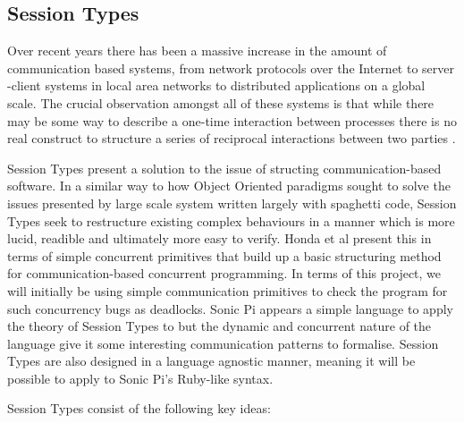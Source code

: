 \documentclass[11pt, abstracton, twoside, titlepage=true]{scrartcl}
\begin{document}
\subsection{Session Types}
Over recent years there has been a massive increase in the amount of 
communication based systems, from network protocols over the Internet to server
-client systems in local area networks to distributed applications on a global 
scale. The crucial observation amongst all of these systems is that while 
there may be some way to describe a one-time interaction between processes 
there is no real construct to structure a series of reciprocal interactions 
between two parties \cite{HVM98}.

Session Types present a solution to the issue of structing communication-based 
software. In a similar way to how Object Oriented paradigms sought to solve 
the issues presented by large scale system written largely with spaghetti 
code, Session Types seek to restructure existing complex behaviours in a 
manner which is more lucid, readible and ultimately more easy to verify. Honda 
et al \cite{HVM98} present this in terms of simple concurrent primitives that 
build up a basic structuring method for communication-based concurrent 
programming. In terms of this project, we will initially be using simple 
communication primitives to check the program for such concurrency bugs as 
deadlocks. Sonic Pi appears a simple language to apply the theory of Session 
Types to but the dynamic and concurrent nature of the language give it some 
interesting communication patterns to formalise. Session Types 
are also designed in a language agnostic manner, meaning it will be possible to 
apply to Sonic Pi's Ruby-like syntax.

Session Types consist of the following key ideas:
\end{document}
